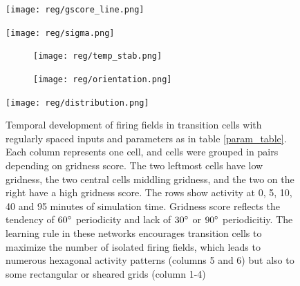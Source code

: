 \documentclass{article}
\begin{document}
    \begin{figure}[H]
        \centering
        \begin{minipage}[b]{0.395\textwidth}
            \begin{minipage}[b]{\textwidth}
                \subcaption{}
                \texttt{[image: reg/gscore\_line.png]}
            \end{minipage}
            \begin{minipage}[b]{\textwidth}
                \subcaption{}
                \texttt{[image: reg/sigma.png]}
            \end{minipage}
            \begin{minipage}[b]{\textwidth}
                \begin{subfigure}{0.47\textwidth}
                    \subcaption{}
                    \texttt{[image: reg/temp\_stab.png]}
                \end{subfigure}
                \begin{subfigure}{0.47\textwidth}
                    \subcaption{}
                    \texttt{[image: reg/orientation.png]}
                \end{subfigure}
            \end{minipage}
        \end{minipage}
        \begin{minipage}[b]{0.56\textwidth}
            \subcaption{}
            \texttt{[image: reg/distribution.png]}
        \end{minipage}
        \caption{Temporal development of firing fields in transition cells with regularly spaced inputs and parameters as in table \ref{param_table}. Each column represents one cell, and cells were grouped in pairs depending on gridness score. The two leftmost cells have low gridness, the two central cells middling gridness, and the two on the right have a high gridness score. The rows show activity at 0, 5, 10, 40 and 95 minutes of simulation time. Gridness score reflects the tendency of \(60\degree\) periodicity and lack of \(30\degree\) or \(90\degree\) periodicitiy. The learning rule in these networks encourages transition cells to maximize the number of isolated firing fields, which leads to numerous hexagonal activity patterns (columns 5 and 6) but also to some rectangular or sheared grids (column 1-4)} 
        \label{low-high_gscores}
    \end{figure}
\end{document}
